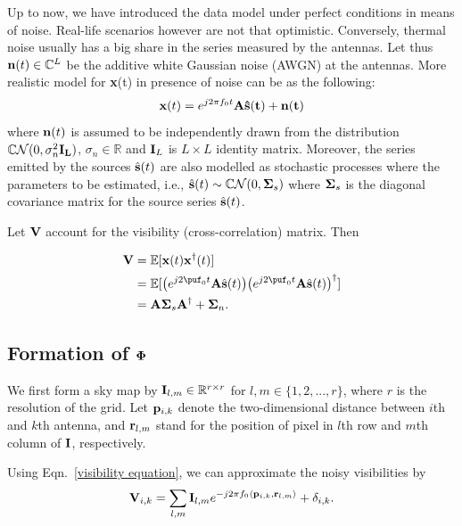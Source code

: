 \documentclass{article}
\begin{document}
 Up to now, we have introduced the data model under perfect conditions in means of noise. Real-life scenarios however are not that optimistic. Conversely, thermal noise usually has a big share in the series measured by the antennas. Let thus ${\bf n}(t) \in \mathbb{C}^L$ be the additive white Gaussian noise (AWGN) at the antennas. More realistic model for {\bf x}(t) in presence of noise can be as the following:
 \begin{equation}
 {\bf x}(t) = e^{j2\pi f_0 t}\bf{A} \hat{\bf{s}}(t) + {\bf n}(t)\label{x_t}
 \end{equation}
where ${\bf n}(t)$ is assumed to be independently drawn from the distribution $\mathbb{C} \mathcal{N}(0,\sigma_n^2 \bf{I}_L)$, $\sigma_n \in \mathbb{R}$ and ${\bf I}_L$ is $L\times L$ identity matrix. Moreover, the series emitted by the sources $\hat{{\bf s}}(t)$ are also modelled as stochastic processes where the parameters to be estimated, i.e., $\hat{{\bf s}}(t) \sim \mathbb{C}\mathcal{N}(0, {\bf \Sigma}_s)$ where ${\bf \Sigma}_s$ is the diagonal covariance matrix for the source series $\hat{{\bf s}}(t)$. 

Let ${\bf V}$ account for the visibility (cross-correlation) matrix. Then

\begin{equation}
\begin{split}
{\bf V} & = \mathbb{E}[{\bf x}(t){\bf x}^{\dagger}(t)]\\
& = \mathbb{E}[\big(e^{j2\puf_0t}{\bf A}\hat{\bf s}(t)\big)\big(e^{j2\puf_0t}{\bf A}\hat{\bf s}(t)\big)^{\dagger}]\\
& ={\bf A}{\bf \Sigma}_s{\bf A}^{\dagger} + {\bf \Sigma}_n.
    \end{split}
\end{equation}

\subsection{Formation of ${\bf \Phi}$}
We first form a sky map by ${\bf I}_{l, m} \in \mathbb{R}^{r\times r}$ for $l, m \in \{1, 2, ..., r \}$, where $r$ is the resolution of the grid. Let ${\bf p}_{i, k}$ denote the two-dimensional distance between $i$th and $k$th antenna, and ${\bf r}_{l, m}$ stand for the position of pixel in $l$th row and $m$th column of ${\bf I}$, respectively. 

Using Eqn.~\ref{visibility equation}, we can approximate the noisy visibilities by
\begin{equation}\label{measurement_equation}
    {\bf V}_{i, k} = \sum_{l, m} {\bf I}_{l, m} e^{-j2\pi f_0 \langle{\bf p}_{i, k}, {\bf r}_{l, m}\rangle} + \delta_{i, k}.
\end{equation}
\end{document}
